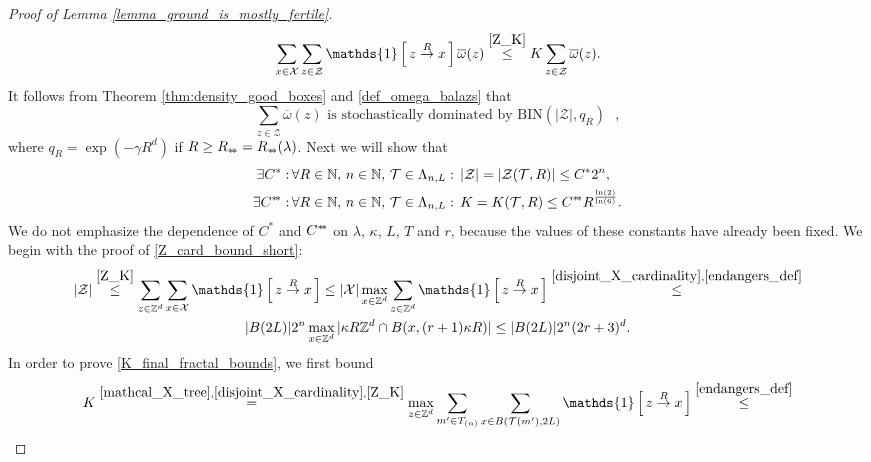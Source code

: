 \documentclass[a4paper,12pt]{article}
\newcommand{\sstar}{* \hspace{-.05cm} *}
\begin{document}
\begin{proof}[Proof of Lemma \ref{lemma_ground_is_mostly_fertile}]
\begin{equation}
\sum_{x \in \mathcal{X} }\sum_{z \in \mathcal{Z}}
\mathds{1}\left[ \,  z \stackrel{R}{\rightarrow} x \, \right]\overline{\omega}(z) \stackrel{ \eqref{Z_K} }{\leq} K  \sum_{z \in \mathcal{Z}} \overline{\omega}(z).
\end{equation}
It follows from Theorem \ref{thm:density_good_boxes} and \eqref{def_omega_balazs} that
\begin{equation}\label{bad_boxes_binomial}
 \text{$\sum_{z \in \mathcal{Z}} \overline{\omega}(z)$ is stochastically dominated by $\mathrm{BIN}( |\mathcal{Z}|, q_R)$ },
 \end{equation}
where $q_R=\exp\left(-\gamma R^d \right)$ if $R \geq R_{\sstar}=R_{\sstar}(\lambda)$. Next we will show that
\begin{align}
\label{Z_card_bound_short}
 \exists  C^* : & \, \forall  R \in \mathbb{N},\, n \in \mathbb{N},\, \mathcal{T} \in \Lambda_{n,L}  : \,
 |\mathcal{Z}|= |\mathcal{Z}( \mathcal{T}, R )| \leq C^* 2^n, \\
\label{K_final_fractal_bounds}
 \exists  C^{\sstar} : & \, \forall  R \in \mathbb{N},\, n \in \mathbb{N},\, \mathcal{T} \in \Lambda_{n,L}  : \,
 K=K(\mathcal{T},R) \leq C^{\sstar} R^{\frac{\ln(2)}{\ln(6)}}.
\end{align}
We do not emphasize the dependence of  $C^*$ and $C^{\sstar}$ on $\lambda$, $\kappa$, $L$, $T$ and $r$, because the values of these constants
have already been fixed.
We begin with the proof of \eqref{Z_card_bound_short}:
\begin{multline}\label{Z_cardinality_bound}
|\mathcal{Z}| \stackrel{ \eqref{Z_K} }{\leq}  \sum_{z \in \mathbb{Z}^d} \sum_{x \in \mathcal{X} } \mathds{1}\left[ \,  z \stackrel{R}{\rightarrow} x \, \right]
\leq
 |\mathcal{X}| \max_{x \in \mathbb{Z}^d } \sum_{z \in \mathbb{Z}^d}  \mathds{1}\left[ \,  z \stackrel{R}{\rightarrow} x \, \right]
 \stackrel{ \eqref{disjoint_X_cardinality}, \eqref{endangers_def} }{\leq} \\
  |B(2L)| 2^n \max_{x \in \mathbb{Z}^d } | \kappa R \mathbb{Z}^d \cap B(x,(r+1)\kappa R)  |
 \leq |B(2L)| 2^n (2r+3)^d.
\end{multline}
In order to prove \eqref{K_final_fractal_bounds}, we first bound
\begin{multline}\label{K_bound_tree}
K \stackrel{  \eqref{mathcal_X_tree}, \eqref{disjoint_X_cardinality}, \eqref{Z_K}  }{=}
\max_{z \in \mathbb{Z}^d } \sum_{ m' \in T_{(n)} } \sum_{ x \in B( \mathcal{T}(m'),2L ) } \mathds{1}\left[ \,  z \stackrel{R}{\rightarrow} x \, \right]
\stackrel{ \eqref{endangers_def} }{\leq} \\

\end{multline}
\end{proof}
\end{document}
